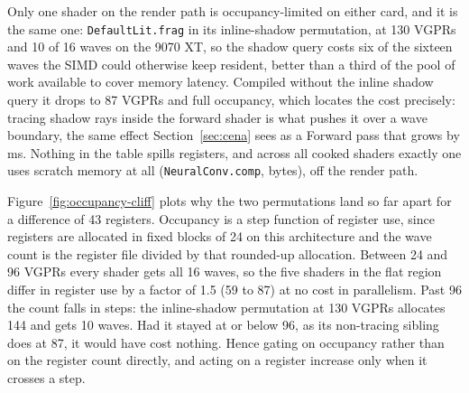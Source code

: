 \begin{table}[tbp]
\caption[Shader registers and theoretical occupancy]{Registers and theoretical occupancy of the key shaders on both GPUs. For AMD: VGPR count and
the largest possible number of wave32 waves per SIMD (1536 VGPRs, granularity 24, at most 16). For
NVIDIA: registers per thread and the largest number of warps per SM (65536 registers, at most 48).
Both figures are derived from the register count rather than measured with a profiler.
Generated from the committed baselines by \texttt{tools/gen\_shader\_tables.py}.}
\label{tab:occupancy}
\centering

\end{table}

Only one shader on the render path is occupancy-limited on either card, and it is the same one:
\texttt{DefaultLit.frag} in its inline-shadow permutation, at 130 VGPRs and 10 of 16 waves on the
9070 XT, so the shadow query costs six of the sixteen waves the SIMD could otherwise keep resident,
better than a third of the pool of work available to cover memory latency. Compiled without the
inline shadow query it drops to 87 VGPRs and full occupancy, which
locates the cost precisely: tracing shadow rays inside the forward shader is what pushes it over a
wave boundary, the same effect Section~\ref{sec:cena} sees as a Forward pass that grows by \perfFwdGrowAMD{} ms.
Nothing in the table spills registers, and across all \rgaShaderCount{} cooked shaders exactly one uses scratch
memory at all (\texttt{NeuralConv.comp}, \rgaScratchBytes{} bytes), off the render path.

Figure~\ref{fig:occupancy-cliff} plots why the two permutations land so far apart for a difference of
43 registers. Occupancy is a step function of register use, since registers are allocated in fixed
blocks of 24 on this architecture and the wave count is the register file divided by that rounded-up
allocation. Between 24 and 96 VGPRs every shader gets all 16 waves, so the five shaders in the flat
region differ in register use by a factor of 1.5 (59 to 87) at no cost in parallelism. Past 96 the
count falls in steps: the inline-shadow permutation at 130 VGPRs allocates 144 and gets 10 waves. Had
it stayed at or below 96, as its non-tracing sibling does at 87, it would have cost nothing. Hence gating
on occupancy rather than on the register count directly, and acting on a register increase only when
it crosses a step.

